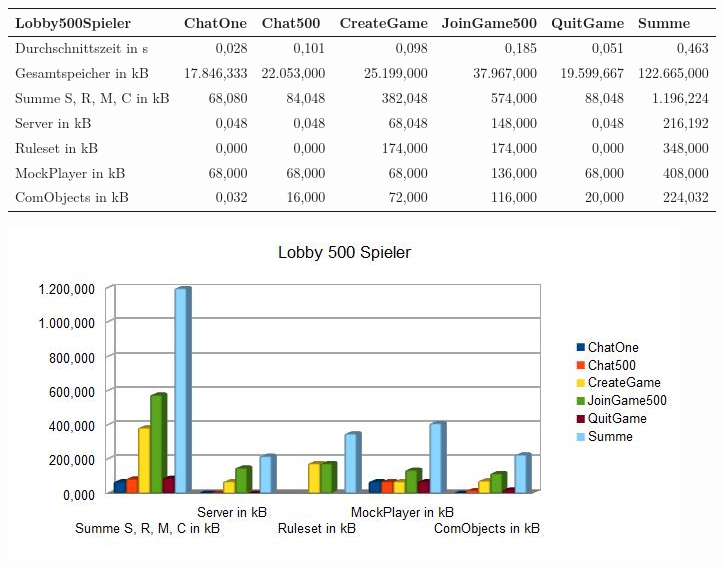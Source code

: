 \documentclass[a4paper]{article}
\begin{document}
\noindent
\begin{tabular}{|l|r|r|r|r|r|r|}
\hline
Lobby500Spieler & \multicolumn{1}{l|}{ChatOne} & \multicolumn{1}{l|}{Chat500} & \multicolumn{1}{l|}{CreateGame} & \multicolumn{1}{l|}{JoinGame500} & \multicolumn{1}{l|}{QuitGame} & \multicolumn{1}{l|}{Summe} \\ \hline \hline
Durchschnittszeit in s & 0,028 & 0,101 & 0,098 & 0,185 & 0,051 & 0,463 \\ \hline
Gesamtspeicher in kB & 17.846,333 & 22.053,000 & 25.199,000 & 37.967,000 & 19.599,667 & 122.665,000 \\ \hline
Summe S, R, M, C in kB & 68,080 & 84,048 & 382,048 & 574,000 & 88,048 & 1.196,224 \\ \hline
Server in kB & 0,048 & 0,048 & 68,048 & 148,000 & 0,048 & 216,192 \\ \hline
Ruleset in kB & 0,000 & 0,000 & 174,000 & 174,000 & 0,000 & 348,000 \\ \hline
MockPlayer in kB & 68,000 & 68,000 & 68,000 & 136,000 & 68,000 & 408,000 \\ \hline
ComObjects in kB & 0,032 & 16,000 & 72,000 & 116,000 & 20,000 & 224,032 \\ \hline
\end{tabular}

\begin{center}
\includegraphics[scale=0.7]{1}
\end{center}
\end{document}
